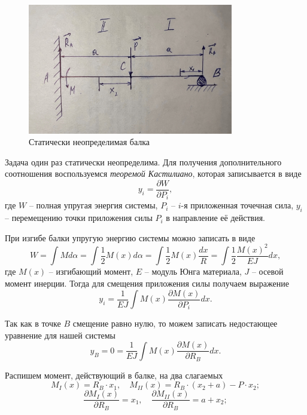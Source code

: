 \documentclass[a4paper,12pt]{article}
\begin{document}
\begin{figure}[H]\label{fig:izgib} 
    \centering
    \includegraphics[width = 0.8\textwidth]{Изгиб.jpg}
    \caption{Статически неопределимая балка}
\end{figure}

Задача один раз статически неопределима. Для получения дополнительного соотношения воспользуемся \textit{теоремой Кастилиано}, которая записывается в виде
\[y_i = \frac{\partial W}{\partial P_i},\]
где $W$ -- полная упругая энергия системы, $P_i$ -- $i$-я приложенная точечная сила, $y_i$ -- перемещению точки приложения силы $P_i$ в направление её действия.

При изгибе балки упругую энергию системы можно записать в виде 
\[W = \int M d\alpha = \int \frac{1}{2} M(x) d\alpha = \int \frac{1}{2} M(x) \frac{dx}{R} = \int \frac{1}{2} \frac{M(x)^2}{E J} dx,\]
где $M(x)$ -- изгибающий момент, $E$ -- модуль Юнга материала, $J$ -- осевой момент инерции. Тогда для смещения приложения силы получаем выражение
\begin{equation}\label{eq: y_i via M}
    y_i = \frac{1}{E J} \int M(x) \frac{\partial M(x)}{\partial P_i} dx.
\end{equation}

Так как в точке $B$ смещение равно нулю, то можем записать недостающее уравнение для нашей системы
\[y_B = 0 = \frac{1}{E J} \int M(x) \frac{\partial M(x)}{\partial R_B} dx.\]

Распишем момент, действующий в балке, на два слагаемых 
\begin{equation}\label{eq: M_1 and M_2}
    M_I(x) = R_B \cdot x_1, \quad M_{II}(x) = R_B \cdot (x_2 + a) - P \cdot x_2;
\end{equation}
\begin{equation}\label{eq: M_1' and M_2'}
    \frac{\partial M_I(x)}{\partial R_B} = x_1, \quad \frac{\partial M_{II}(x)}{\partial R_B} = a + x_2;
\end{equation}
\end{document}
